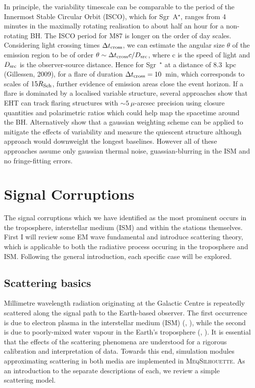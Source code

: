 In principle, the variability timescale can be comparable to the period of the Innermost Stable Circular Orbit (ISCO), which for Sgr~A$^\star$, ranges from 4 minutes in the maximally rotating realisation to about half an hour for a non-rotating BH. The ISCO period for M87 is longer on the order of day scales. Considering light crossing times $\Delta t_{\rm cross}$, we can estimate the angular size $\theta$ of the emission region to be of order $\theta \sim \Delta t_{\rm cross} c /D_{\rm src}$, where c is the speed of light and $D_{\rm src}$ is the observer-source distance. Hence for Sgr~$^\star$ at a distance of $8.3$~kpc (Gillessen, 2009), for a flare of duration $ \Delta t_{\rm cross} =10$~min, which corresponds to scales of  $15 R_{\rm Sch}$, further evidence of emission areas close the event horizon.
If a flare is dominated by a localised variable structure, several approaches \citep{Doeleman_2009, Fish_2009b, Johnson_2014} show that EHT can track flaring structures with $\sim 5\ \mu$-arcsec precision using closure quantities and polarimetric ratios which could help map the spacetime around the BH. Alternatively \citet{Lu_2016} show that a gaussian weighting scheme can be applied to mitigate the effects of variability and measure the quiescent structure although approach would downweight the longest baselines. However all of these approaches assume only gaussian thermal noise, guassian-blurring in the ISM and no fringe-fitting errors.

\section{Signal Corruptions}

The signal corruptions which we have identified as the most prominent occurs in the troposphere, interstellar medium (ISM) and within the stations themselves. First I will review some EM wave fundamental and introduce scattering theory, which is applicable to both the radiative process occuring in the troposphere and ISM. Following the general introduction, each specific case will be explored.

\subsection{Scattering basics}\label{sec:basic_scat}

Millimetre wavelength radiation originating at the Galactic Centre is repeatedly scattered along the signal path to the Earth-based observer. The first occurrence is due to electron plasma in the interstellar medium (ISM) (\citealt{Bower_2006}, \citealt{Gwinn_2014}), while the second is due to poorly-mixed water vapour in the Earth's troposphere (\citealt*{Carilli_1999}, \citealt*{Lay_1997}). It is essential that the effects of the scattering phenomena are understood for a rigorous calibration and interpretation of data.  Towards this end, simulation modules approximating scattering in both media are implemented in \textsc{MeqSilhouette}. As an introduction to the separate descriptions of each, we review a simple scattering model.

